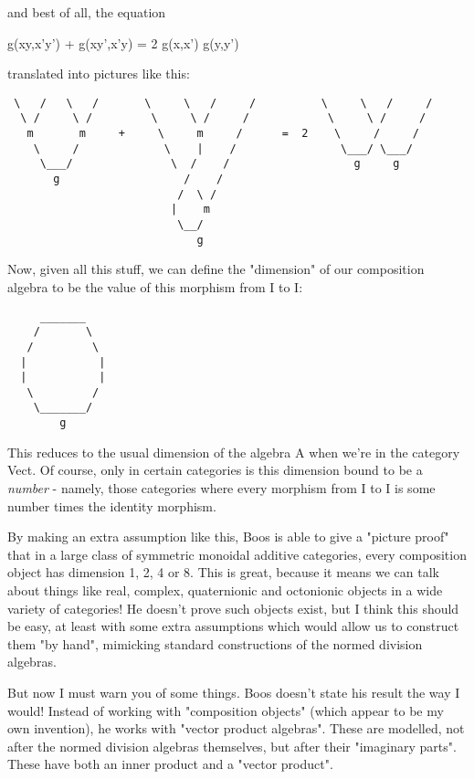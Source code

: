 and best of all, the equation

g(xy,x'y') + g(xy',x'y) = 2 g(x,x') g(y,y')

translated into pictures like this:

\begin{verbatim}
 \   /   \   /       \     \   /     /          \     \   /     /
  \ /     \ /         \     \ /     /            \     \ /     /
   m       m     +     \     m     /      =  2    \     /     /
    \     /             \    |    /                \___/ \___/
     \___/               \  /    /                   g     g
       g                   /    /
                          /  \ /
                         |    m
                          \__/
                             g
\end{verbatim}
    
Now, given all this stuff, we can define the "dimension" of our
composition algebra to be the value of this morphism from I to I:
         
\begin{verbatim}
     _______
    /       \
   /         \
  |           |
  |           |
   \         /
    \_______/
        g
\end{verbatim}
    
This reduces to the usual dimension of the algebra A when we're in 
the category Vect.   Of course, only in certain categories is
this dimension bound to be a \emph{number} - namely, those categories where
every morphism from I to I is some number times the identity morphism.

By making an extra assumption like this, Boos is able to give a
"picture proof" that in a large class of symmetric monoidal
additive categories, every composition object has dimension 1, 2, 4 or
8.  This is great, because it means we can talk about things like real,
complex, quaternionic and octonionic objects in a wide variety of
categories!  He doesn't prove such objects exist, but I think this
should be easy, at least with some extra assumptions which would allow
us to construct them "by hand", mimicking standard
constructions of the normed division algebras.

But now I must warn you of some things.  Boos doesn't state his result
the way I would!  Instead of working with "composition
objects" (which appear to be my own invention), he works with
"vector product algebras".  These are modelled, not after the
normed division algebras themselves, but after their "imaginary
parts".  These have both an inner product and a "vector
product".

